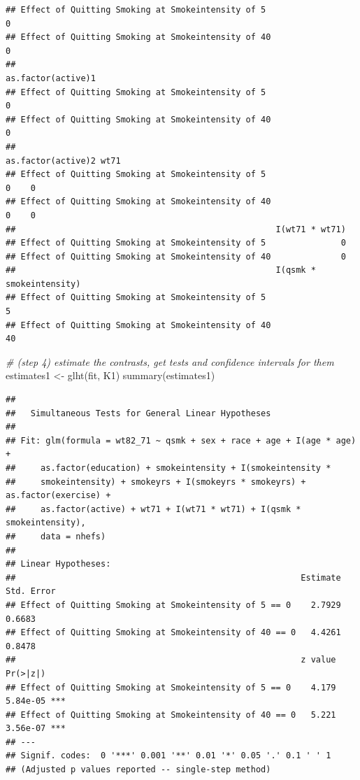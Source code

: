 \documentclass[
  10pt,
]{book}
\newenvironment{Shaded}{\begin{snugshade}}{\end{snugshade}}
\newcommand{\CommentTok}[1]{\textcolor[rgb]{0.56,0.35,0.01}{\textit{#1}}}
\newcommand{\FunctionTok}[1]{\textcolor[rgb]{0.00,0.00,0.00}{#1}}
\newcommand{\NormalTok}[1]{#1}
\newcommand{\OtherTok}[1]{\textcolor[rgb]{0.56,0.35,0.01}{#1}}
\begin{document}
\begin{verbatim}
## Effect of Quitting Smoking at Smokeintensity of 5                     0
## Effect of Quitting Smoking at Smokeintensity of 40                    0
##                                                    as.factor(active)1
## Effect of Quitting Smoking at Smokeintensity of 5                   0
## Effect of Quitting Smoking at Smokeintensity of 40                  0
##                                                    as.factor(active)2 wt71
## Effect of Quitting Smoking at Smokeintensity of 5                   0    0
## Effect of Quitting Smoking at Smokeintensity of 40                  0    0
##                                                    I(wt71 * wt71)
## Effect of Quitting Smoking at Smokeintensity of 5               0
## Effect of Quitting Smoking at Smokeintensity of 40              0
##                                                    I(qsmk * smokeintensity)
## Effect of Quitting Smoking at Smokeintensity of 5                         5
## Effect of Quitting Smoking at Smokeintensity of 40                       40
\end{verbatim}

\begin{Shaded}
\begin{Highlighting}[]
\CommentTok{\# (step 4) estimate the contrasts, get tests and confidence intervals for them}
\NormalTok{estimates1 }\OtherTok{\textless{}{-}} \FunctionTok{glht}\NormalTok{(fit, K1)}
  \FunctionTok{summary}\NormalTok{(estimates1)}
\end{Highlighting}
\end{Shaded}

\begin{verbatim}
## 
##   Simultaneous Tests for General Linear Hypotheses
## 
## Fit: glm(formula = wt82_71 ~ qsmk + sex + race + age + I(age * age) + 
##     as.factor(education) + smokeintensity + I(smokeintensity * 
##     smokeintensity) + smokeyrs + I(smokeyrs * smokeyrs) + as.factor(exercise) + 
##     as.factor(active) + wt71 + I(wt71 * wt71) + I(qsmk * smokeintensity), 
##     data = nhefs)
## 
## Linear Hypotheses:
##                                                         Estimate Std. Error
## Effect of Quitting Smoking at Smokeintensity of 5 == 0    2.7929     0.6683
## Effect of Quitting Smoking at Smokeintensity of 40 == 0   4.4261     0.8478
##                                                         z value Pr(>|z|)    
## Effect of Quitting Smoking at Smokeintensity of 5 == 0    4.179 5.84e-05 ***
## Effect of Quitting Smoking at Smokeintensity of 40 == 0   5.221 3.56e-07 ***
## ---
## Signif. codes:  0 '***' 0.001 '**' 0.01 '*' 0.05 '.' 0.1 ' ' 1
## (Adjusted p values reported -- single-step method)
\end{verbatim}
\end{document}
